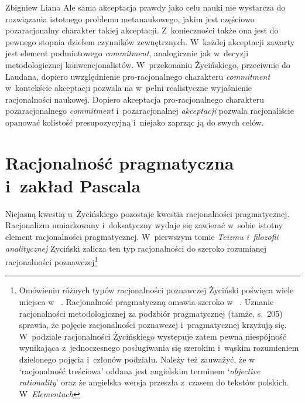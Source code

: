 \begin{artplenv}{Zbigniew Liana}
Ale sama akceptacja prawdy jako celu nauki nie wystarcza do rozwiązania istotnego problemu metanaukowego, jakim jest częściowo pozaracjonalny charakter takiej akceptacji. Z~konieczności także ona jest do pewnego stopnia dziełem czynników zewnętrznych. W~każdej akceptacji zawarty jest element podmiotowego \textit{commitment}, analogicznie jak w~decyzji metodologicznej konwencjonalistów. W~przekonaniu Życińskiego, przeciwnie do Laudana, dopiero uwzględnienie pro-racjonalnego charakteru \textit{commitment} w~kontekście akceptacji pozwala na w~pełni realistyczne wyjaśnienie racjonalności naukowej. Dopiero akceptacja pro-racjonalnego charakteru pozaracjonalnego \textit{commitment} i~pozaracjonalnej \textit{akceptacji} pozwala racjonaliście opanować kolistość presupozycyjną i~niejako zaprząc ją do swych celów.

\section{Racjonalność pragmatyczna i~zakład Pascala}
Niejasną kwestią u~Życińskiego pozostaje kwestia racjonalności pragmatycznej. Racjonalizm umiarkowany i~doksatyczny wydaje się zawierać w~sobie istotny element racjonalności pragmatycznej. W~pierwszym tomie \textit{Teizmu i~filozofii analitycznej}
\parencite*[][]{zycinski_teizm_1985} %
 Życiński zalicza ten typ racjonalności do szeroko rozumianej racjonalności poznawczej\footnote{Omówieniu różnych typów racjonalności poznawczej Życiński poświęca wiele miejsca w~
\parencites[][s.~195–216]{zycinski_teizm_1985}[][s.~128–135]{zycinski_structure_1988}[][s.~276–239]{zycinski_struktura_2013_liana}[zob. także][s.~14.235-240]{zycinski_granice_1993}. %
 Racjonalność pragmatyczną omawia szeroko w~
\parencite[][s.~205n.207-216]{zycinski_teizm_1985}. %
 Uznanie racjonalności metodologicznej za podzbiór pragmatycznej (tamże, s.~205) sprawia, że pojęcie racjonalności poznawczej i~pragmatycznej krzyżują się. W~podziale racjonalności Życińskiego występuje zatem pewna niespójność wynikająca z~jednoczesnego posługiwania się szerokim i~wąskim rozumieniem dzielonego pojęcia i~członów podziału. Należy też zauważyć, że w~
\parencites[][s.~132]{zycinski_structure_1988}[por.][s.~234]{zycinski_struktura_2013_liana} %
 ‘racjonalność treściowa' oddana jest angielskim terminem ‘\textit{objective rationality}' oraz że angielska wersja przeszła z~czasem do tekstów polskich. W~\textit{Elementach} 
}
\end{artplenv}
